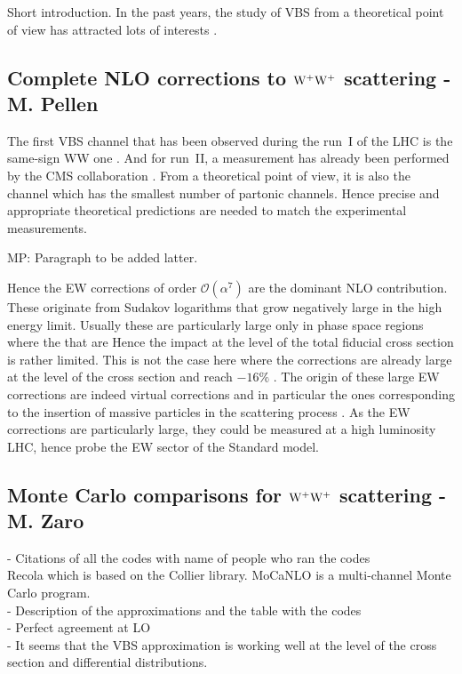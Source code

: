 \newcommand{\MP}[1]{{ {\color{blue}{ [MP: #1]}} }}

Short introduction.
In the past years, the study of VBS from a theoretical point of view has attracted lots of interests \cite{Rauch:2016pai}.

\subsection{Complete NLO corrections to ${\rm W^+ W^+}$ scattering - M. Pellen}

The first VBS channel that has been observed during the run~I of the LHC is the same-sign WW one \cite{Aad:2014zda,Aaboud:2016ffv,Khachatryan:2014sta}.
And for run~II, a measurement has already been performed by the CMS collaboration \cite{CMS:2017adb}.
From a theoretical point of view, it is also the channel which has the smallest number of partonic channels.
Hence precise and appropriate theoretical predictions are needed to match the experimental measurements.

MP: Paragraph to be added latter.

Hence the EW corrections of order $\mathcal{O}\left(\alpha^7\right)$ are the dominant NLO contribution.
These originate from Sudakov logarithms that grow negatively large in the high energy limit.
Usually these are particularly large only in phase space regions where the  that are
Hence the impact at the level of the total fiducial cross section is rather limited.
This is not the case here where the corrections are already large at the level of the cross section and reach $-16\%$ \cite{Biedermann:2016yds}.
The origin of these large EW corrections are indeed virtual corrections and in particular the ones corresponding to the insertion of massive particles in the scattering process \cite{Biedermann:2016yds}.
As the EW corrections are particularly large, they could be measured at a high luminosity LHC, hence probe the EW sector of the Standard model.

\subsection{Monte Carlo comparisons for ${\rm W^+ W^+}$ scattering - M. Zaro}

- Citations of all the codes with name of people who ran the codes \\
Recola \cite{Actis:2012qn,Actis:2016mpe} which is based on the Collier \cite{Denner:2014gla,Denner:2016kdg} library.
MoCaNLO is a multi-channel Monte Carlo program. \\
- Description of the approximations and the table with the codes \\
- Perfect agreement at LO \\
- It seems that the VBS approximation is working well at the level of the cross section and differential distributions. \\

